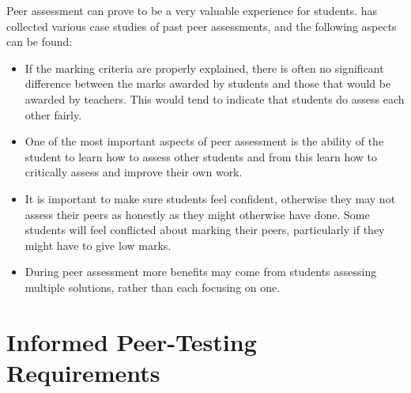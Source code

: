 \documentclass[sigplan,10pt,review]{acmart}\settopmatter{printfolios=true}
\begin{document}
Peer assessment can prove to be a very valuable experience for
students. \citet{falchikov_improving_2013} has collected various case
studies of past peer assessments, and the following aspects can be
found:
\begin{itemize}
\item If the marking criteria are properly explained, there is often
  no significant difference between the marks awarded by students and
  those that would be awarded by teachers. This would tend to indicate
  that students do assess each other fairly.
\item One of the most important aspects of peer assessment is the
  ability of the student to learn how to assess other students and
  from this learn how to critically assess and improve their own work.
\item It is important to make sure students feel confident, otherwise
  they may not assess their peers as honestly as they might otherwise
  have done. Some students will feel conflicted about marking their
  peers, particularly if they might have to give low marks.
\item During peer assessment more benefits may come from students
  assessing multiple solutions, rather than each focusing on one.
\end{itemize}



\section{Informed Peer-Testing Requirements}
\end{document}
